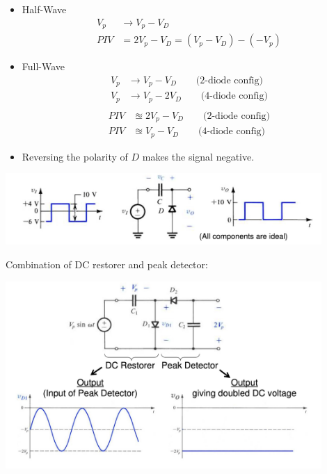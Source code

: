 \documentclass{article}
\begin{document}
\clearpage

\begin{itemize}
\item Half-Wave
  \begin{align*}
    V_p &\to V_p - V_D\\
    PIV &= 2V_p - V_D = (V_p - V_D) - (- V_p)
  \end{align*}
\item Full-Wave
  \begin{align*}
    V_p &\to V_p - V_D \qquad \text{(2-diode config)}\\
    V_p &\to V_p - 2V_D \qquad \text{(4-diode config)}\\
  \end{align*}
  \begin{align*}
    PIV &\approxeq 2V_p - V_D \qquad \text{(2-diode config)}\\
    PIV &\approxeq V_p - V_D \qquad \text{(4-diode config)}
  \end{align*}
\end{itemize}

\begin{itemize}
\item Reversing the polarity of $D$ makes the signal negative.
\end{itemize}
\begin{center}
  \includegraphics[width=0.9\textwidth]{images/dc_restorer.jpg}
\end{center}

 Combination of DC restorer and peak detector:
\begin{center}
  \includegraphics[width=0.9\textwidth]{images/voltage_doubler.jpg}
\end{center}
\end{document}
